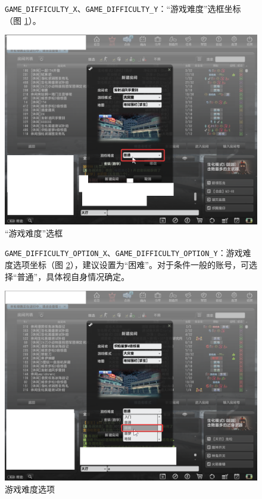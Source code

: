 \begin{figure}[H]
    \Centering
    \parbox[l]{\textwidth}{\lstinline{GAME_DIFFICULTY_X}、\lstinline{GAME_DIFFICULTY_Y}：“游戏难度”选框坐标（图 \ref{ch2fig-choose-difficulty}）。}
    \includegraphics[width=\textwidth]{docs/assets/choose_difficulty.png}
    \caption{“游戏难度”选框}
    \label{ch2fig-choose-difficulty}
\end{figure}
\clearpage

\begin{figure}[H]
    \Centering
    \parbox[l]{\textwidth}{\lstinline{GAME_DIFFICULTY_OPTION_X}、\lstinline{GAME_DIFFICULTY_OPTION_Y}：游戏难度选项坐标（图 \ref{ch2fig-difficulty-option}），建议设置为“困难”。对于条件一般的账号，可选择“普通”，具体视自身情况确定。}
    \includegraphics[width=\textwidth]{docs/assets/difficulty_option.png}
    \caption{游戏难度选项}
    \label{ch2fig-difficulty-option}
\end{figure}
\clearpage

